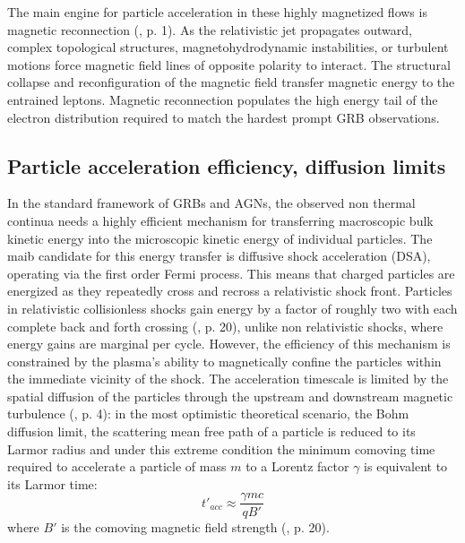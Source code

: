 \documentclass{aa} %
\begin{document}
The main engine for particle acceleration in these highly magnetized flows is magnetic reconnection (\citet{Peer2019}, p. 1). As the relativistic jet propagates outward, complex topological structures, magnetohydrodynamic instabilities, or turbulent motions force magnetic field lines of opposite polarity to interact. The structural collapse and reconfiguration of the magnetic field transfer magnetic energy to the entrained leptons. Magnetic reconnection populates the high energy tail of the electron distribution required to match the hardest prompt GRB observations. 

\subsection{Particle acceleration efficiency, diffusion limits}

In the standard framework of GRBs and AGNs, the observed non thermal continua needs a highly efficient mechanism for transferring macroscopic bulk kinetic energy into the microscopic kinetic energy of individual particles. The maib candidate for this energy transfer is diffusive shock acceleration (DSA), operating via the first order Fermi process. This means that charged particles are energized as they repeatedly cross and recross a relativistic shock front. Particles in relativistic collisionless shocks gain energy by a factor of roughly two with each complete back and forth crossing (\citet{KumarandZhang2015}, p. 20), unlike non relativistic shocks, where energy gains are marginal per cycle. However, the efficiency of this mechanism is constrained by the plasma's ability to magnetically confine the particles within the immediate vicinity of the shock.
The acceleration timescale is limited by the spatial diffusion of the particles through the upstream and downstream magnetic turbulence (\citet{Peer2019}, p. 4): in the most optimistic theoretical scenario, the Bohm diffusion limit, the scattering mean free path of a particle is reduced to its Larmor radius and under this extreme condition the minimum comoving time required to accelerate a particle of mass $m$ to a Lorentz factor $\gamma$ is equivalent to its Larmor time:
$$t'_{acc} \approx \frac{\gamma m c}{q B'}$$
where $B'$ is the comoving magnetic field strength (\citet{KumarandZhang2015}, p. 20).
\end{document}

